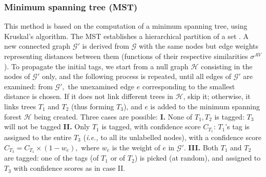 \subsubsection{Minimum spanning tree (MST)}
This method is based on the computation of a minimum spanning tree, using Kruskal's algorithm. The MST establishes a hierarchical partition of a set \cite{perret2015}. A new connected graph $\mathcal{G'}$ is derived from $\mathcal{G}$ with the same nodes but edge weights representing distances between them (functions of their respective similarities $\sigma^{AV}$). To propagate the initial tags, we start from a null graph $\mathcal{H}$ consisting in the nodes of $\mathcal{G'}$ only, and the following process is repeated, until all edges of $\mathcal{G'}$ are examined: from $\mathcal{G'},$ the unexamined edge $e$ corresponding to the smallest distance is chosen. If it does not link different trees in \color{black}$\mathcal{H}$\color{black},  skip it; otherwise, it links trees $T_1$ and $T_2$ (thus forming  $T_3$), and $e$ is added to the minimum spanning forest $\mathcal{H}$ being created. Three cases are possible: 
\textbf{I.}  None of $T_1, T_2$ is tagged: $T_3$ will not be tagged \textbf{II. } Only $T_1$ is tagged, with confidence score $C_{T_1}$: $T_1$'s tag is assigned to the entire  $T_3$ (\textit{i.e.,} to all its unlabelled nodes), with a confidence score $C_{T_3} = C_{T_1}\times(1-w_e), $ where $w_e$ is the weight of $e$ \color{black} in $\mathcal{G'}$. \color{black} \textbf{III. } Both $T_1$ and $T_2$ are tagged: one of the tags (of $T_1$ or of $T_2$) is picked (at random), and assigned to  $T_3$ with confidence scores as in case II. 


\endinput